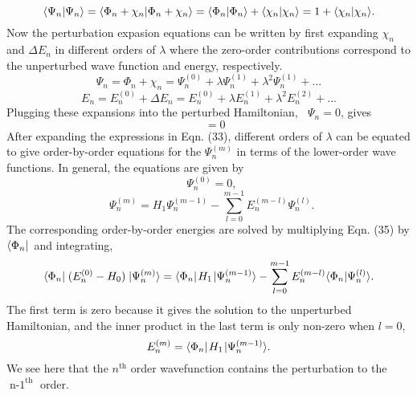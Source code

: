 \documentclass[thesis.tex]{subfiles}
\begin{document}
\begin{equation}
\langle \Psi_{n} | \Psi_{n}\rangle=\langle \Phi_{n}+\chi_{n} | \Phi_{n}+\chi_{n}\rangle=\langle \Phi_{n} | \Phi_{n}\rangle+\langle \chi_{n} | \chi_{n}\rangle=1+\langle \chi_{n} | \chi_{n}\rangle.
\end{equation}
Now the perturbation expasion equations can be written by first expanding $\chi_{n}$ and $\Delta E_{n}$ in different orders of $\lambda$ where the zero-order contributions correspond to the unperturbed wave function and energy, respectively.
\begin{equation}
\Psi_{n}=\Phi_{n}+\chi_{n}=\Psi^{(0)}_{n}+\lambda\Psi^{(1)}_{n}+\lambda^{2}\Psi^{(1)}_{n}+...
\end{equation}
\begin{equation}
E_{n}=E^{(0)}_{n}+\Delta E_{n}=E^{(0)}_{n}+\lambda E^{(1)}_{n}+\lambda^{2}E^{(2)}_{n}+...
\end{equation}
Plugging these expansions into the perturbed Hamiltonian, $\mathop{(H_{0}+\lambda H_{1}-E_{n})}\Psi_{n}=0$, gives
\begin{equation}
\mathop{(H_{0}+\lambda H_{1}-E^{(0)}_{n}-\lambda E^{(1)}_{n}-\lambda^{2}E^{(2)}_{n}-...)}\mathop{(\Psi^{(0)}_{n}+\lambda\Psi^{(1)}_{n}+\lambda^{2}\Psi^{(1)}_{n}+...)}=0
\end{equation}
After expanding the expressions in Eqn. (33), different orders of $\lambda$ can be equated to give order-by-order equations for the $\Psi^{(m)}_{n}$ in terms of the lower-order wave functions. In general, the equations are given by
\begin{equation}
\mathop{(E^{(0)}_{n}-H_{0})}\Psi^{(0)}_{n}=0,
\end{equation}
\begin{equation}
\mathop{(E^{(0)}_{n}-H_{0})}\Psi^{(m)}_{n}=H_{1}\Psi^{(m-1)}_{n}-\sum_{l=0}^{m-1}E^{(m-l)}_{n}\Psi^{(l)}_{n}.
\end{equation}
The corresponding order-by-order energies are solved by multiplying Eqn. (35) by $\langle \Phi_{n} |\hspace{1pt}$ and integrating,
\begin{equation}
\langle \Phi_{n} |\hspace{1pt}\mathop{(E^{(0)}_{n}-H_{0})}\hspace{1pt}| \Psi^{(m)}_{n} \rangle=\langle \Phi_{n} |\hspace{1pt}H_{1}\hspace{1pt}| \Psi^{(m-1)}_{n} \rangle-\sum_{l=0}^{m-1}E^{(m-l)}_{n}\langle \Phi_{n} | \Psi^{(l)}_{n}\rangle.
\end{equation}
The first term is zero because it gives the solution to the unperturbed Hamiltonian, and the inner product in the last term is only non-zero when $l=0$,
\begin{equation}
E^{(m)}_{n}=\langle \Phi_{n} |\hspace{1pt}H_{1}\hspace{1pt}| \Psi^{(m-1)}_{n} \rangle.
\end{equation}
We see here that the $n^{\text{th}}$ order wavefunction contains the perturbation to the $\mathop{n-1}^{\text{th}}$ order.
\end{document}
